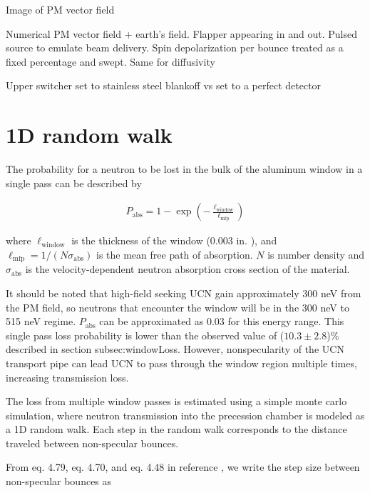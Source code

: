 
Image of PM vector field

Numerical PM vector field + earth's field. Flapper appearing in and out. Pulsed source to emulate beam delivery. Spin depolarization per bounce treated as a fixed percentage and swept. Same for diffusivity

Upper switcher set to stainless steel blankoff vs set to a perfect detector



\section{1D random walk}\label{sec:1D_random_walk}


The probability for a neutron to be lost in the bulk of the aluminum window in a single pass can be described by

\begin{gather}
   P_\text{abs} = 1 - \exp \left( - \frac{\ell_\text{window} }{ \ell_\text{mfp} } \right)
\end{gather}

where $\ell_\text{window}$ is the thickness of the window (0.003 in. ), and $\ell_\text{mfp} = 1 / (N\sigma_\text{abs})$ is the mean free path of absorption. $N$ is number density and $\sigma_\text{abs}$ is the velocity-dependent neutron absorption cross section of the material. 

It should be noted that high-field seeking UCN gain approximately 300 neV from the PM field, so neutrons that encounter the window will be in the 300 neV to 515 neV regime. $P_\text{abs}$ can be approximated as 0.03 for this energy range. This single pass loss probability is lower than the observed value of ($10.3\pm 2.8$)\% described in section subsec:windowLoss. However, nonspecularity of the UCN transport pipe can lead UCN to pass through the window region multiple times, increasing transmission loss. 

The loss from multiple window passes is estimated using a simple monte carlo simulation, where neutron transmission into the precession chamber is modeled as a 1D random walk. Each step in the random walk corresponds to the distance traveled between non-specular bounces. 

From eq. 4.79, eq. 4.70, and eq. 4.48 in reference \cite{golubUCN}, we write the step size between non-specular bounces as

